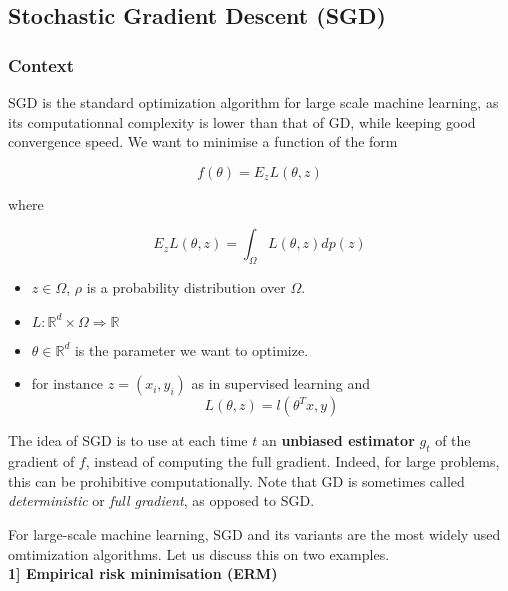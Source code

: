 \documentclass[
10pt, %
a4paper, %
oneside, %
headinclude,footinclude, %
BCOR5mm, %
]{scrartcl}
\begin{document}
\subsection{\large\color{MidnightBlue}Stochastic Gradient Descent (SGD)}
\label{sec:sgd}

\subsubsection{\large\color{Periwinkle}Context}

SGD is the standard optimization algorithm for large scale machine learning, as its computationnal complexity is lower than that of GD, while keeping good convergence speed. We want to minimise a function of the form

\begin{equation*}
    f(\theta)=  E_z L(\theta, z)
\end{equation*}

where 

\begin{equation*}
    E_z L(\theta, z) = \int_{\Omega} L(\theta, z)dp(z)
\end{equation*}


\begin{itemize}
    \item $z\in \Omega$, $\rho$ is a probability distribution over $ \Omega$.
    \item $L: \mathbb{R}^d\times \Omega \Rightarrow \mathbb{R}$
    \item $\theta \in \mathbb{R}^d$ is the parameter we want to optimize.
    \item for instance $ z = (x_i, y_i)$ as in supervised learning and
\begin{equation*}
    L(\theta, z) = l(\theta^T x, y)
\end{equation*}
\end{itemize}

The idea of SGD is to use at each time $t$ an \textbf{{unbiased estimator}}
$g_t$  of the gradient of $f$, instead of computing the full gradient. Indeed,
for large problems, this can be prohibitive computationally. Note that GD is
sometimes called \textit{{deterministic}} or \textit{{full gradient}}, as
opposed to SGD.

For large-scale machine learning, SGD and its variants are the most widely used
omtimization algorithms. Let us discuss this on two examples. 
\\

\textbf{{1] Empirical risk minimisation (ERM)}}
\end{document}

